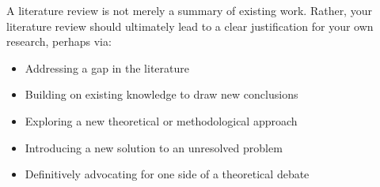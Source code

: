 A literature review is not merely a summary of existing work. Rather, your literature review should ultimately lead to a clear justification for your own research, perhaps via:
\begin{itemize}
    \item Addressing a gap in the literature
    \item Building on existing knowledge to draw new conclusions
    \item Exploring a new theoretical or methodological approach
    \item Introducing a new solution to an unresolved problem
    \item Definitively advocating for one side of a theoretical debate
\end{itemize}
